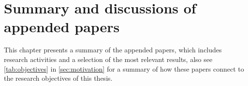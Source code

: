 \chapter{Summary and discussions of appended papers}\label{ch:results}
\noindent This chapter presents a summary of the appended papers, which includes research activities and a selection of the most relevant results, also see \autoref{tab:objectives} in \autoref{sec:motivation} for a summary of how these papers connect to the research objectives of this thesis.





%






